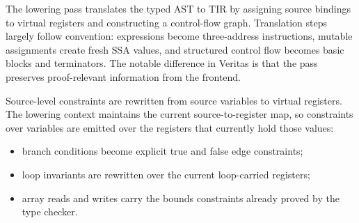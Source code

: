 The lowering pass translates the typed AST to TIR by assigning source bindings to virtual registers and constructing a control-flow graph. Translation steps largely follow convention: expressions become three-address instructions, mutable assignments create fresh SSA values, and structured control flow becomes basic blocks and terminators. The notable difference in Veritas is that the pass preserves proof-relevant information from the frontend.

Source-level constraints are rewritten from source variables to virtual registers. The lowering context maintains the current source-to-register map, so constraints over variables are emitted over the registers that currently hold those values:
\begin{itemize}
  \item branch conditions become explicit true and false edge constraints;
  \item loop invariants are rewritten over the current loop-carried registers;
  \item array reads and writes carry the bounds constraints already proved by the type checker.
\end{itemize}

%
%

